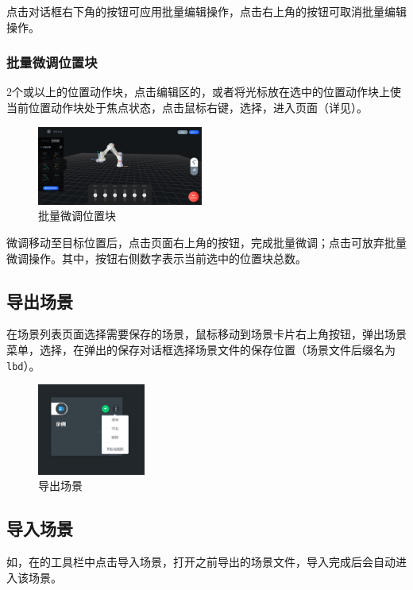 点击对话框右下角的按钮可应用批量编辑操作，点击右上角的\kbd{$\times$}按钮可取消批量编辑操作。


\subsubsection{批量微调位置块}
\ttt 2个或以上的位置动作块，点击编辑区的，或者将光标放在选中的位置动作块上使当前位置动作块处于焦点状态，点击鼠标右键，选择，进入页面（详见）。

\begin{figure}[hb]
	\centering
	\includegraphics[height=2.6cm]{shots/batch_adjust_positions.pdf}
	\caption{批量微调位置块}
	\label{fig:批量微调位置块}
\end{figure}

微调移动至目标位置后，点击页面右上角的按钮，完成批量微调；点击可放弃批量微调操作。其中，按钮右侧数字表示当前选中的位置块总数。

\clearpage

\subsection{导出场景}
在场景列表页面选择需要保存的场景，鼠标移动到场景卡片右上角按钮，弹出场景菜单，选择，在弹出的保存对话框选择场景文件的保存位置（场景文件后缀名为 \verb|lbd|）。

\begin{figure}[htb!]
	\centering
	\includegraphics[height=3cm]{screen/3-19.png}
	\caption{导出场景}
	\label{fig:导出场景}
\end{figure}

\subsection{导入场景}
如，在的工具栏中点击导入场景，打开之前导出的场景文件，导入完成后会自动进入该场景。

